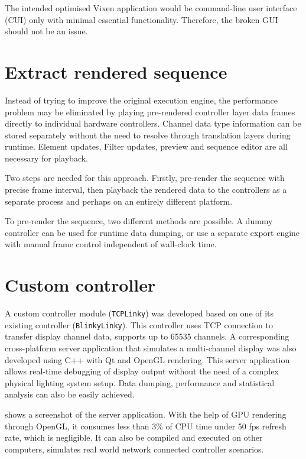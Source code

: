 The intended optimised Vixen application would be command-line user interface (CUI) only with minimal essential functionality. Therefore, the broken GUI should not be an issue.

\section{Extract rendered sequence}

Instead of trying to improve the original execution engine, the performance problem may be eliminated by playing pre-rendered controller layer data frames directly to individual hardware controllers. Channel data type information can be stored separately without the need to resolve through translation layers during runtime. Element updates, Filter updates, preview and sequence editor are all necessary for playback.

Two steps are needed for this approach. Firstly, pre-render the sequence with precise frame interval, then playback the rendered data to the controllers as a separate process and perhaps on an entirely different platform.

To pre-render the sequence, two different methods are possible. A dummy controller can be used for runtime data dumping, or use a separate export engine with manual frame control independent of wall-clock time.

\section{Custom controller}
\label{sec:tcplinky}

A custom controller module (\texttt{TCPLinky}) was developed based on one of its existing controller (\texttt{BlinkyLinky}). This controller uses TCP connection to transfer display channel data, supports up to 65535 channels. A corresponding cross-platform server application that simulates a multi-channel display was also developed using C++ with Qt \cite{qt} and OpenGL \cite{shreiner2009opengl} rendering. This server application allows real-time debugging of display output without the need of a complex physical lighting system setup. Data dumping, performance and statistical analysis can also be easily achieved. 

 shows a screenshot of the server application. With the help of GPU rendering through OpenGL, it consumes less than $3 \%$ of CPU time under 50 fps refresh rate, which is negligible. It can also be compiled and executed on other computers, simulates real world network connected controller scenarios.


